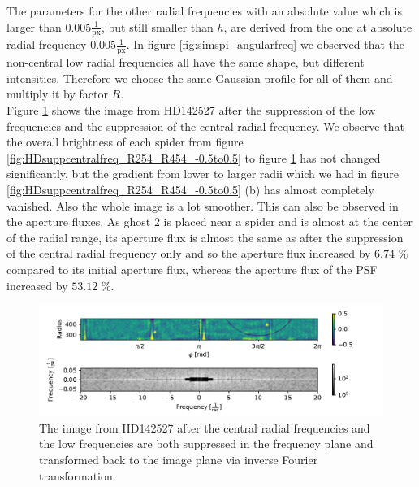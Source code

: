 The parameters for the other radial frequencies with an absolute value which is larger than $0.005 \frac{1}{\mathrm{px}}$, but still smaller than $h$, are derived from the one at absolute radial frequency $0.005 \frac{1}{\mathrm{px}}$. In figure \ref{fig:simspi_angularfreq} we observed that the non-central low radial frequencies all have the same shape, but different intensities. Therefore we choose the same Gaussian profile for all of them and multiply it by factor $R$.\\
Figure \ref{fig:HDsupplowfreq_R254_R454_-0.5to0.5.pdf} shows the image from HD142527 after the suppression of the low frequencies and the suppression of the central radial frequency. We observe that the overall brightness of each spider from figure \ref{fig:HDsuppcentralfreq_R254_R454_-0.5to0.5} to figure \ref{fig:HDsupplowfreq_R254_R454_-0.5to0.5.pdf} has not changed significantly, but the gradient from lower to larger radii which we had in figure \ref{fig:HDsuppcentralfreq_R254_R454_-0.5to0.5} (b) has almost completely vanished. Also the whole image is a lot smoother. This can also be observed in the aperture fluxes. As ghost 2 is placed near a spider and is almost at the center of the radial range, its aperture flux is almost the same as after the suppression of the central radial frequency only and so the aperture flux increased by $6.74$ \% compared to its initial aperture flux, whereas the aperture flux of the PSF increased by $53.12$ \%. 
\begin{figure}[H]
	\centering
		\includegraphics[width=1.1\textwidth]{pics/HDsupplowfreq_R254_R454_-0.5to0.5.pdf}
		\caption{The image from HD142527 after the central radial frequencies and the low frequencies are both suppressed in the frequency plane and transformed back to the image plane via inverse Fourier transformation.}
		\label{fig:HDsupplowfreq_R254_R454_-0.5to0.5.pdf}
\end{figure}

